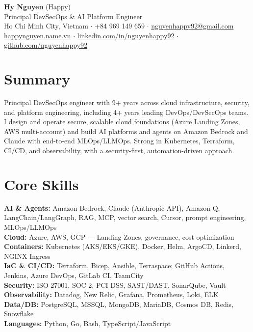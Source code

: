 \documentclass[a4paper,10pt]{article}
\begin{document}
{\Huge\bfseries\color{dark} Hy Nguyen }{\large\color{muted}(Happy)}\\[4pt]
{\large\color{accent} Principal DevSecOps \& AI Platform Engineer}\\[6pt]
{\small
Ho Chi Minh City, Vietnam $\cdot$ +84 969 149 659 $\cdot$
\href{mailto:nguyenhappy92@gmail.com}{nguyenhappy92@gmail.com}\\[3pt]
\href{https://happynguyen.name.vn}{happynguyen.name.vn} $\cdot$
\href{https://www.linkedin.com/in/nguyenhappy92}{linkedin.com/in/nguyenhappy92} $\cdot$
\href{https://github.com/nguyenhappy92}{github.com/nguyenhappy92}}

\section{Summary}
Principal DevSecOps engineer with 9+ years across cloud infrastructure, security, and
platform engineering, including 4+ years leading DevOps/DevSecOps teams. I design and
operate secure, scalable cloud foundations (Azure Landing Zones, AWS multi-account) and
build AI platforms and agents on Amazon Bedrock and Claude with end-to-end MLOps/LLMOps.
Strong in Kubernetes, Terraform, CI/CD, and observability, with a security-first,
automation-driven approach.

\section{Core Skills}
\textbf{AI \& Agents:} Amazon Bedrock, Claude (Anthropic API), Amazon Q, LangChain/LangGraph,
RAG, MCP, vector search, Cursor, prompt engineering, MLOps/LLMOps\\[2pt]
\textbf{Cloud:} Azure, AWS, GCP --- Landing Zones, governance, cost optimization\\[2pt]
\textbf{Containers:} Kubernetes (AKS/EKS/GKE), Docker, Helm, ArgoCD, Linkerd, NGINX Ingress\\[2pt]
\textbf{IaC \& CI/CD:} Terraform, Bicep, Ansible, Terraspace; GitHub Actions, Jenkins,
Azure DevOps, GitLab CI, TeamCity\\[2pt]
\textbf{Security:} ISO 27001, SOC 2, PCI DSS, SAST/DAST, SonarQube, Vault\\[2pt]
\textbf{Observability:} Datadog, New Relic, Grafana, Prometheus, Loki, ELK\\[2pt]
\textbf{Data/DB:} PostgreSQL, MSSQL, MongoDB, MariaDB, Cosmos DB, Redis, Snowflake\\[2pt]
\textbf{Languages:} Python, Go, Bash, TypeScript/JavaScript
\end{document}
